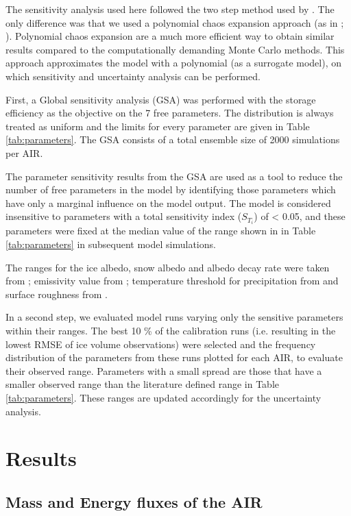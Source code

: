 \documentclass[utf8]{frontiersSCNS} %
\begin{document}
The sensitivity analysis used here followed the two step method used by \cite{ZollesMaussion_2019}.  The only difference
was that we used a polynomial chaos expansion approach (as in \cite{uncertainpy_2018}; \cite{Xiu_2005}).  Polynomial
chaos expansion are a much more efficient way to obtain similar results compared to the computationally demanding Monte
Carlo methods. This approach approximates the model with a polynomial (as a surrogate model), on which sensitivity and
uncertainty analysis can be performed.

First, a Global sensitivity analysis (GSA) was performed with the storage efficiency as the objective on the 7 free
parameters. The distribution is always treated as uniform and the limits for every parameter are given in Table
\ref{tab:parameters}. The GSA consists of a total ensemble size of 2000 simulations per AIR.

The parameter sensitivity results from the GSA are used as a tool to reduce the number of free parameters in the model
by identifying those parameters which have only a marginal influence on the model output. The model is considered
insensitive to parameters with a total sensitivity index ($S_{T_{i}}$) of < 0.05, and these parameters were fixed at the
median value of the range shown in in Table \ref{tab:parameters} in subsequent model simulations.

The ranges for the ice albedo, snow albedo and albedo decay rate were taken from \cite{ZollesMaussion_2019}; emissivity
value from \cite{steiner_2015}; temperature threshold for precipitation from \cite{Zhou_2010} and surface roughness from
\cite{BrockWillisSharp_2006}.

In a second step, we evaluated model runs varying only the sensitive parameters within their ranges. The best 10 \% of
the calibration runs (i.e. resulting in the lowest RMSE of ice volume observations) were selected and the frequency
distribution of the parameters from these runs plotted for each AIR, to evaluate their observed range. Parameters with a
small spread are those that have a smaller observed range than the literature defined range in Table
\ref{tab:parameters}. These ranges are updated accordingly for the uncertainty analysis.

\section{Results}

\subsection{Mass and Energy fluxes of the AIR}
\end{document}
